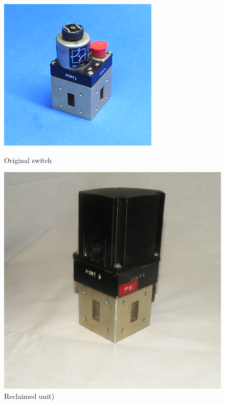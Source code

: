\documentclass[12pt]{article}
\begin{document}
\begin{figure}[tb]
  \centering
  \begin{minipage}[b]{0.4\textwidth}
    \includegraphics[width=\textwidth]{wr-90-s1.jpg}
    \caption{\label{f_wg_switch_orig}Original switch}  
  \end{minipage}
  \begin{minipage}[b]{0.4\textwidth}
    \includegraphics[width=\textwidth]{WGFinal.jpg}
    \caption{\label{f_wg_switch_new}Reclaimed unit)}      
  \end{minipage}
  \end{figure}
\end{document}
